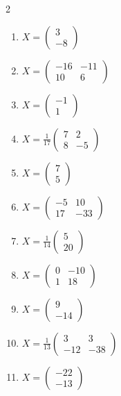 \begin{multicols}{2}\raggedright
\begin{enumerate}[label=\arabic*., leftmargin=*, itemsep=1pt]
\item $X=\left(\begin{smallmatrix}3\\ -8\end{smallmatrix}\right)$
\item $X=\left(\begin{smallmatrix}-16 & -11\\ 10 & 6\end{smallmatrix}\right)$
\item $X=\left(\begin{smallmatrix}-1\\ 1\end{smallmatrix}\right)$
\item $X=\frac{1}{17}\left(\begin{smallmatrix}7 & 2\\ 8 & -5\end{smallmatrix}\right)$
\item $X=\left(\begin{smallmatrix}7\\ 5\end{smallmatrix}\right)$
\item $X=\left(\begin{smallmatrix}-5 & 10\\ 17 & -33\end{smallmatrix}\right)$
\item $X=\frac{1}{14}\left(\begin{smallmatrix}5\\ 20\end{smallmatrix}\right)$
\item $X=\left(\begin{smallmatrix}0 & -10\\ 1 & 18\end{smallmatrix}\right)$
\item $X=\left(\begin{smallmatrix}9\\ -14\end{smallmatrix}\right)$
\item $X=\frac{1}{13}\left(\begin{smallmatrix}3 & 3\\ -12 & -38\end{smallmatrix}\right)$
\item $X=\left(\begin{smallmatrix}-22\\ -13\end{smallmatrix}\right)$

\end{enumerate}
\end{multicols}
